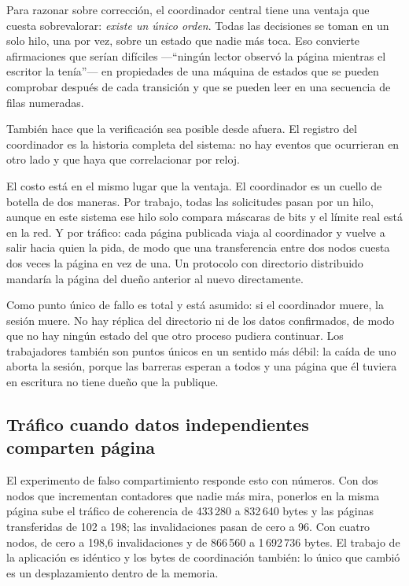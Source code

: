 Para razonar sobre corrección, el coordinador central tiene una ventaja que
cuesta sobrevalorar: \emph{existe un único orden}. Todas las decisiones se
toman en un solo hilo, una por vez, sobre un estado que nadie más toca. Eso
convierte afirmaciones que serían difíciles —``ningún lector observó la página
mientras el escritor la tenía''— en propiedades de una máquina de estados que
se pueden comprobar después de cada transición y que se pueden leer en una
secuencia de filas numeradas.

También hace que la verificación sea posible desde afuera. El registro del
coordinador es la historia completa del sistema: no hay eventos que ocurrieran
en otro lado y que haya que correlacionar por reloj.

El costo está en el mismo lugar que la ventaja. El coordinador es un cuello de
botella de dos maneras. Por trabajo, todas las solicitudes pasan por un hilo,
aunque en este sistema ese hilo solo compara máscaras de bits y el límite real
está en la red. Y por tráfico: cada página publicada viaja al coordinador y
vuelve a salir hacia quien la pida, de modo que una transferencia entre dos
nodos cuesta dos veces la página en vez de una. Un protocolo con directorio
distribuido mandaría la página del dueño anterior al nuevo directamente.

Como punto único de fallo es total y está asumido: si el coordinador muere, la
sesión muere. No hay réplica del directorio ni de los datos confirmados, de
modo que no hay ningún estado del que otro proceso pudiera continuar. Los
trabajadores también son puntos únicos en un sentido más débil: la caída de
uno aborta la sesión, porque las barreras esperan a todos y una página que él
tuviera en escritura no tiene dueño que la publique.

\subsection{Tráfico cuando datos independientes comparten página}

El experimento de falso compartimiento responde esto con números. Con dos
nodos que incrementan contadores que nadie más mira, ponerlos en la misma
página sube el tráfico de coherencia de 433\,280 a 832\,640 bytes y las
páginas transferidas de 102 a 198; las invalidaciones pasan de cero a 96. Con
cuatro nodos, de cero a 198,6 invalidaciones y de 866\,560 a
1\,692\,736 bytes.
El trabajo de la aplicación es idéntico y los bytes de coordinación también:
lo único que cambió es un desplazamiento dentro de la memoria.

